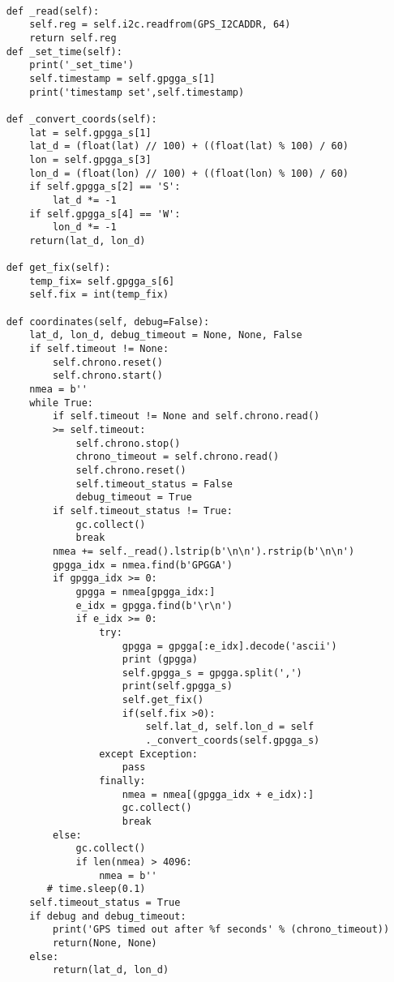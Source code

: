 \begin{appendices}
\begin{lstlisting}
           
    def _read(self):
        self.reg = self.i2c.readfrom(GPS_I2CADDR, 64)
        return self.reg
    def _set_time(self):
        print('_set_time')
        self.timestamp = self.gpgga_s[1]
        print('timestamp set',self.timestamp)

    def _convert_coords(self):
        lat = self.gpgga_s[1]
        lat_d = (float(lat) // 100) + ((float(lat) % 100) / 60)
        lon = self.gpgga_s[3]
        lon_d = (float(lon) // 100) + ((float(lon) % 100) / 60)
        if self.gpgga_s[2] == 'S':
            lat_d *= -1
        if self.gpgga_s[4] == 'W':
            lon_d *= -1
        return(lat_d, lon_d)

    def get_fix(self):
        temp_fix= self.gpgga_s[6]
        self.fix = int(temp_fix)

    def coordinates(self, debug=False):
        lat_d, lon_d, debug_timeout = None, None, False
        if self.timeout != None:
            self.chrono.reset()
            self.chrono.start()
        nmea = b''
        while True:
            if self.timeout != None and self.chrono.read() 
            >= self.timeout:
                self.chrono.stop()
                chrono_timeout = self.chrono.read()
                self.chrono.reset()
                self.timeout_status = False
                debug_timeout = True
            if self.timeout_status != True:
                gc.collect()
                break
            nmea += self._read().lstrip(b'\n\n').rstrip(b'\n\n')
            gpgga_idx = nmea.find(b'GPGGA')
            if gpgga_idx >= 0:
                gpgga = nmea[gpgga_idx:]
                e_idx = gpgga.find(b'\r\n')
                if e_idx >= 0:
                    try:
                        gpgga = gpgga[:e_idx].decode('ascii')
                        print (gpgga)
                        self.gpgga_s = gpgga.split(',')
                        print(self.gpgga_s)
                        self.get_fix()
                        if(self.fix >0):
                            self.lat_d, self.lon_d = self
                            ._convert_coords(self.gpgga_s)
                    except Exception:
                        pass
                    finally:
                        nmea = nmea[(gpgga_idx + e_idx):]
                        gc.collect()
                        break
            else:
                gc.collect()
                if len(nmea) > 4096:
                    nmea = b''
           # time.sleep(0.1)
        self.timeout_status = True
        if debug and debug_timeout:
            print('GPS timed out after %f seconds' % (chrono_timeout))
            return(None, None)
        else:
            return(lat_d, lon_d)



\end{lstlisting}
\end{appendices}
